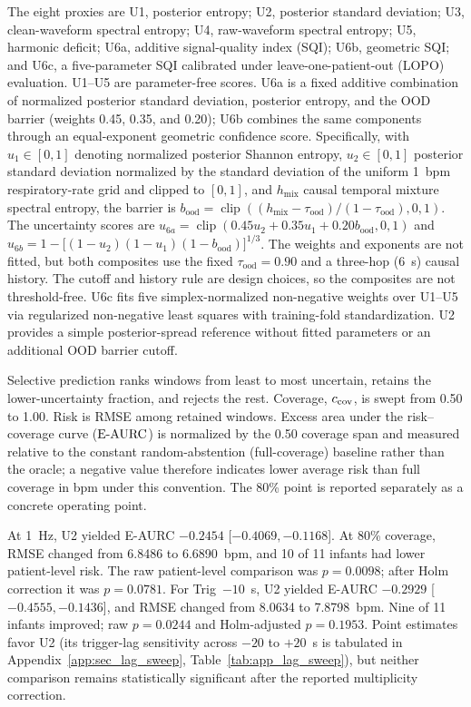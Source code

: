 The eight proxies are U1, posterior entropy; U2, posterior standard deviation; U3, clean-waveform spectral entropy; U4, raw-waveform spectral entropy; U5, harmonic deficit; U6a, additive signal-quality index (SQI); U6b, geometric SQI; and U6c, a five-parameter SQI calibrated under leave-one-patient-out (LOPO) evaluation. U1--U5 are parameter-free scores. U6a is a fixed additive combination of normalized posterior standard deviation, posterior entropy, and the OOD barrier (weights 0.45, 0.35, and 0.20); U6b combines the same components through an equal-exponent geometric confidence score. Specifically, with $u_1 \in [0,1]$ denoting normalized posterior Shannon entropy, $u_2 \in [0,1]$ posterior standard deviation normalized by the standard deviation of the uniform 1~bpm respiratory-rate grid and clipped to $[0,1]$, and $h_{\mathrm{mix}}$ causal temporal mixture spectral entropy, the barrier is $b_{\mathrm{ood}}=\operatorname{clip}((h_{\mathrm{mix}}-\tau_{\mathrm{ood}})/(1-\tau_{\mathrm{ood}}),0,1)$. The uncertainty scores are $u_{6a}=\operatorname{clip}(0.45u_2+0.35u_1+0.20b_{\mathrm{ood}},0,1)$ and $u_{6b}=1-\big[(1-u_2)(1-u_1)(1-b_{\mathrm{ood}})\big]^{1/3}$. The weights and exponents are not fitted, but both composites use the fixed $\tau_{\mathrm{ood}}=0.90$ and a three-hop (6~s) causal history. The cutoff and history rule are design choices, so the composites are not threshold-free. U6c fits five simplex-normalized non-negative weights over U1--U5 via regularized non-negative least squares with training-fold standardization. U2 provides a simple posterior-spread reference without fitted parameters or an additional OOD barrier cutoff.

Selective prediction ranks windows from least to most uncertain, retains the lower-uncertainty fraction, and rejects the rest. Coverage, $c_{\mathrm{cov}}$, is swept from 0.50 to 1.00. Risk is RMSE among retained windows. Excess area under the risk--coverage curve ($\mathrm{E\text{-}AURC}$) is normalized by the 0.50 coverage span and measured relative to the constant random-abstention (full-coverage) baseline rather than the oracle; a negative value therefore indicates lower average risk than full coverage in bpm under this convention. The 80\% point is reported separately as a concrete operating point.

At 1~Hz, U2 yielded E-AURC $-0.2454$ [$-0.4069,-0.1168$]. At 80\% coverage, RMSE changed from 6.8486 to 6.6890~bpm, and 10 of 11 infants had lower patient-level risk. The raw patient-level comparison was $p=0.0098$; after Holm correction it was $p=0.0781$. For Trig~$-10$~s, U2 yielded E-AURC $-0.2929$ [$-0.4555,-0.1436$], and RMSE changed from 8.0634 to 7.8798~bpm. Nine of 11 infants improved; raw $p=0.0244$ and Holm-adjusted $p=0.1953$. Point estimates favor U2 (its trigger-lag sensitivity across $-20$ to $+20$~s is tabulated in Appendix~\ref{app:sec_lag_sweep}, Table~\ref{tab:app_lag_sweep}), but neither comparison remains statistically significant after the reported multiplicity correction.

